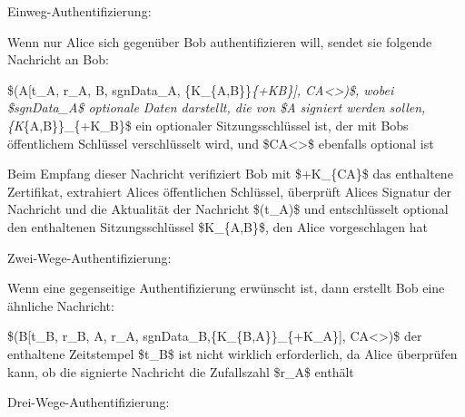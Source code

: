 \documentclass[a4paper]{article}
\begin{document}
\begin{multicols}{3}
      \begin{itemize*}
            \item Einweg-Authentifizierung:
            \begin{itemize*}
                  \item Wenn nur Alice sich gegenüber Bob authentifizieren will, sendet sie folgende Nachricht an Bob:
            \end{itemize*}
            \begin{enumerate*}
                  \def\labelenumi{\arabic{enumi}.}
                  \item \$(A{[}t\_A, r\_A, B, sgnData\_A, \{K\_\{A,B\}\}\emph{\{+KB\}{]}, CA\textless{}\textgreater)\$, wobei \$sgnData\_A\$ optionale Daten darstellt, die von \$A signiert werden sollen, \{K}\{A,B\}\}\_\{+K\_B\}\$ ein optionaler Sitzungsschlüssel ist, der mit Bobs öffentlichem Schlüssel verschlüsselt wird, und \$CA\textless{}\textgreater\$ ebenfalls optional ist
            \end{enumerate*}
            \begin{itemize*}
                  \item Beim Empfang dieser Nachricht verifiziert Bob mit \$+K\_\{CA\}\$ das enthaltene Zertifikat, extrahiert Alices öffentlichen Schlüssel, überprüft Alices Signatur der Nachricht und die Aktualität der Nachricht \$(t\_A)\$ und entschlüsselt optional den enthaltenen Sitzungsschlüssel \$K\_\{A,B\}\$, den Alice vorgeschlagen hat
            \end{itemize*}
            \item Zwei-Wege-Authentifizierung:
            \begin{itemize*}
                  \item Wenn eine gegenseitige Authentifizierung erwünscht ist, dann erstellt Bob eine ähnliche Nachricht:
            \end{itemize*}
            \begin{enumerate*}
                  \def\labelenumi{\arabic{enumi}.}
                  \setcounter{enumi}{1}
                  \item \$(B{[}t\_B, r\_B, A, r\_A, sgnData\_B,\{K\_\{B,A\}\}\_\{+K\_A\}{]}, CA\textless{}\textgreater)\$ der enthaltene Zeitstempel \$t\_B\$ ist nicht wirklich erforderlich, da Alice überprüfen kann, ob die signierte Nachricht die Zufallszahl \$r\_A\$ enthält
            \end{enumerate*}
            \item Drei-Wege-Authentifizierung:
            \begin{itemize*}

\end{itemize*}
\end{itemize*}
\end{multicols}
\end{document}
